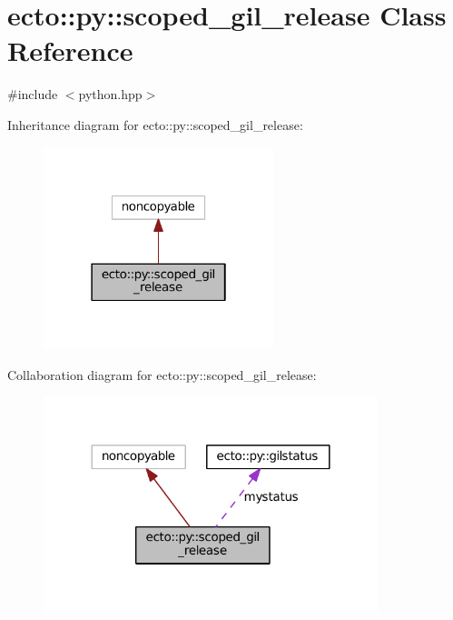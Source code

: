 \hypertarget{classecto_1_1py_1_1scoped__gil__release}{}\section{ecto\+:\+:py\+:\+:scoped\+\_\+gil\+\_\+release Class Reference}
\label{classecto_1_1py_1_1scoped__gil__release}


{\ttfamily \#include $<$python.\+hpp$>$}



Inheritance diagram for ecto\+:\+:py\+:\+:scoped\+\_\+gil\+\_\+release\+:\nopagebreak
\begin{figure}[H]
\begin{center}
\leavevmode
\includegraphics[width=190pt]{classecto_1_1py_1_1scoped__gil__release__inherit__graph}
\end{center}
\end{figure}


Collaboration diagram for ecto\+:\+:py\+:\+:scoped\+\_\+gil\+\_\+release\+:\nopagebreak
\begin{figure}[H]
\begin{center}
\leavevmode
\includegraphics[width=276pt]{classecto_1_1py_1_1scoped__gil__release__coll__graph}
\end{center}
\end{figure}
